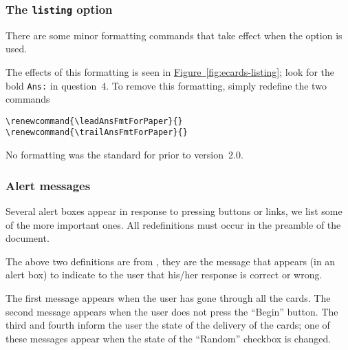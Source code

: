 \documentclass{article}
\begin{document}
\subsubsection{The \texttt{listing} option}

There are some minor formatting commands that take effect when the
 option is used.
\bVerb\takeMeasure{\string\renewcommand\darg{\string\leadAnsFmtForPaper}\darg{\string\textbf\darg{Ans:\string\thinspace[}}}%
\begin{dCmd}[commandchars=!()]{\bxSize}
\renewcommand{\leadAnsFmtForPaper}{\textbf{Ans:\thinspace[}}
\renewcommand{\trailAnsFmtForPaper}{\textbf{]}}
\end{dCmd}
\bVerb The effects of this formatting is seen in
\hyperref[fig:ecards-listing]{Figure~\ref*{fig:ecards-listing}}; look for the bold
\texttt{Ans:} in question~4. To remove this formatting, simply redefine the
two commands
\begin{Verbatim}[xleftmargin=\amtIndent]
\renewcommand{\leadAnsFmtForPaper}{}
\renewcommand{\trailAnsFmtForPaper}{}
\end{Verbatim}
No formatting was the standard for  prior to version~2.0.

\subsubsection{Alert messages}

Several alert boxes appear in response to pressing buttons or links, we list
some of the more important ones. All redefinitions must occur in the preamble
of the document.
\bVerb{}%
\begin{dCmd}[commandchars=*()]{\bxSize}
\renewcommand\eqsqrtmsg{"Right!"}
\renewcommand\eqsqwgmsg{"Wrong!"}
\end{dCmd}
\bVerb The above two definitions are from , they are the message that appears (in an alert box)
to indicate to the user that his/her response is correct or wrong.

\bVerb{}%
\begin{dCmd}[commandchars=!()]{\bxSize}
\renewcommand{\pressBeginMsg}{Press the \"Begin\" button to
    begin viewing the cards.}
\renewcommand{\randomizedMsg}{The cards will be delivered
    to you in random order.}
\renewcommand{\nonrandomizedMsg}{The cards will be delivered
    to you in their natural order.}
\end{dCmd}
\bVerb The first message appears when the user has gone through all the
cards. The second message appears when the user does not press the
``\textsf{Begin}'' button. The third and fourth inform the user the state of
the delivery of the cards; one of these messages appear when the state of the
``\textsf{Random}'' checkbox is changed.
\end{document}
